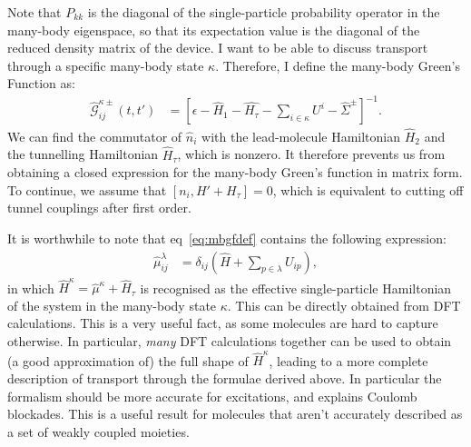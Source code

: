 \documentclass{article}
\begin{document}
\begin{multicols}{2}
        Note that $P_{kk}$ is the diagonal of the single-particle probability operator in the many-body eigenspace, so that its expectation value is the diagonal of the reduced density matrix of the device. I want to be able to discuss transport through a specific many-body state $\kappa$. Therefore, I define the many-body Green's Function as:
        \begin{align}
        \hat{\mathscr{G}}^{\kappa\pm}_{ij} (t,t') &= \left[\epsilon - \hat{H}_1 - \hat{H_\tau} - \sum_{i\in\kappa} U^i - \hat{\Sigma}^\pm \right]^{-1}.
        \label{eq:mbgfdef}
        \end{align}
        We can find the commutator of $\hat{n}_i$ with the lead-molecule Hamiltonian $\hat{H}_2$ and the tunnelling Hamiltonian $\hat{H}_\tau$, which is nonzero. It therefore prevents us from obtaining a closed expression for the many-body Green's function in matrix form. To continue, we assume that $\left[ n_i, H' + H_\tau \right]=0$, which is equivalent to cutting off tunnel couplings after first order.
        
        It is worthwhile to note that eq~\ref{eq:mbgfdef} contains the following expression:
        \begin{align}
        \hat{\mu}^\lambda_{ij} &= \delta_{ij} \left( \hat{H} + \sum_{p\in\lambda} U_{ip} \right) \label{eq:result},
        \end{align}
        in which $\hat{H}^\kappa = \hat{\mu}^\kappa + \hat{H}_\tau$ is recognised as the effective single-particle Hamiltonian of the system in the many-body state $\kappa$. This can be directly obtained from DFT calculations. This is a very useful fact, as some molecules are hard to capture otherwise. In particular, \emph{many} DFT calculations together can be used to obtain (a good approximation of) the full shape of $\hat{H}^\kappa$, leading to a more complete description of transport through the formulae derived above. In particular the formalism should be more accurate for excitations, and explains Coulomb blockades. This is a useful result for molecules that aren't accurately described as a set of weakly coupled moieties.
        

\end{multicols}
\end{document}
